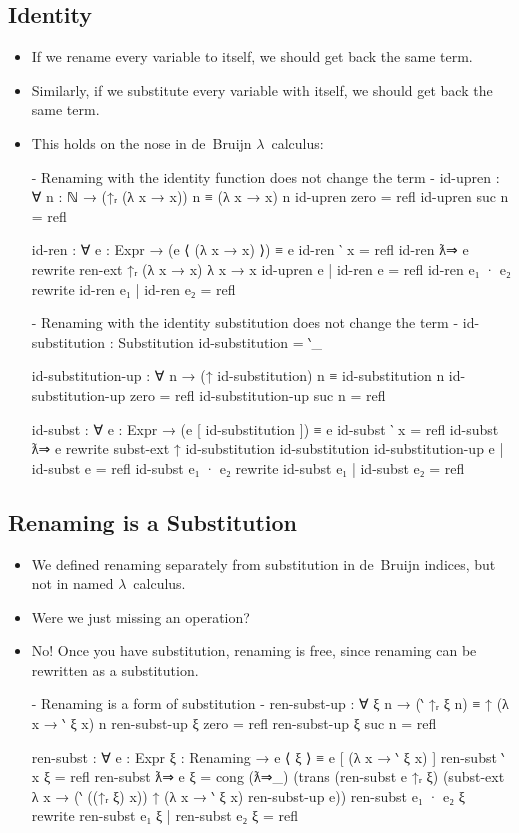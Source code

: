 \documentclass{lecturenotes}
\begin{document}
\newpage
\subsection{Identity}
\label{sec:identity}

\begin{itemize}
  \item If we rename every variable to itself, we should get back the same term.
  \item Similarly, if we substitute every variable with itself, we should get back the same term.
  \item This holds on the nose in de~Bruijn $\lambda$~calculus:
\begin{code}
{- Renaming with the identity function does not change the term -}
id-upren : ∀ {n : ℕ} → (↑ᵣ (λ x → x)) n ≡ (λ x → x) n
id-upren {zero} = refl
id-upren {suc n} = refl

id-ren : ∀ {e : Expr} → (e ⟨ (λ x → x) ⟩) ≡ e
id-ren {‵ x} = refl
id-ren {ƛ⇒ e} rewrite ren-ext {↑ᵣ (λ x → x)} {λ x → x} id-upren e | id-ren {e} = refl 
id-ren {e₁ · e₂} rewrite id-ren {e₁} | id-ren {e₂} = refl

{- Renaming with the identity substitution does not change the term -}
id-substitution : Substitution
id-substitution = ‵_

id-substitution-up : ∀ {n} → (↑ id-substitution) n ≡ id-substitution n
id-substitution-up {zero} = refl
id-substitution-up {suc n} = refl

id-subst : ∀ {e : Expr} → (e [ id-substitution ]) ≡ e
id-subst {‵ x} = refl
id-subst {ƛ⇒ e}
  rewrite subst-ext {↑ id-substitution} {id-substitution} id-substitution-up e
  | id-subst {e} = refl
id-subst {e₁ · e₂} rewrite id-subst {e₁} | id-subst {e₂} = refl
\end{code}
\end{itemize}

\subsection{Renaming is a Substitution}
\label{sec:renam-subst-1}

\begin{itemize}
\item We defined renaming separately from substitution in de~Bruijn indices, but not in named $\lambda$~calculus.
\item Were we just missing an operation?
\item No! Once you have substitution, renaming is free, since renaming can be rewritten as a substitution.
\begin{code}
{- Renaming is a form of substitution -}
ren-subst-up : ∀ {ξ} {n} → (‵ ↑ᵣ ξ n) ≡ ↑ (λ x → ‵ ξ x) n
ren-subst-up {ξ} {zero} = refl
ren-subst-up {ξ} {suc n} = refl

ren-subst : ∀ {e : Expr} {ξ : Renaming} →
  e ⟨ ξ ⟩ ≡ e [ (λ x → ‵ ξ x) ]
ren-subst {‵ x} {ξ} = refl
ren-subst {ƛ⇒ e} {ξ} =
  cong (ƛ⇒_) (trans (ren-subst {e} {↑ᵣ ξ})
             (subst-ext {λ x → (‵ ((↑ᵣ ξ) x))} {↑ (λ x → ‵ ξ x)} ren-subst-up e))
ren-subst {e₁ · e₂} {ξ} rewrite ren-subst {e₁} {ξ} | ren-subst {e₂} {ξ} = refl
\end{code}
\end{itemize}
\end{document}
